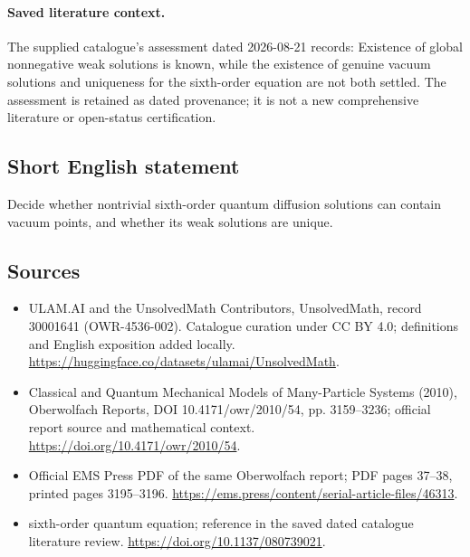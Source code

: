 \documentclass[11pt]{article}
\begin{document}
\paragraph{Saved literature context.} The supplied catalogue's assessment dated 2026-08-21 records: Existence of global nonnegative weak solutions is known, while the existence of genuine vacuum solutions and uniqueness for the sixth-order equation are not both settled. The assessment is retained as dated provenance; it is not a new comprehensive literature or open-status certification.
\subsection{Short English statement}
Decide whether nontrivial sixth-order quantum diffusion solutions can contain vacuum points, and whether its weak solutions are unique.
\subsection{Sources}
\begin{itemize}
\item[\hypertarget{source:30001641:1}{S1}] ULAM.AI and the UnsolvedMath Contributors, UnsolvedMath, record 30001641 (OWR-4536-002). Catalogue curation under CC BY 4.0; definitions and English exposition added locally.
\url{https://huggingface.co/datasets/ulamai/UnsolvedMath}.
\item[\hypertarget{source:30001641:2}{S2}] Classical and Quantum Mechanical Models of Many-Particle Systems (2010), Oberwolfach Reports, DOI 10.4171/owr/2010/54, pp. 3159--3236; official report source and mathematical context.
\url{https://doi.org/10.4171/owr/2010/54}.
\item[\hypertarget{source:30001641:3}{S3}] Official EMS Press PDF of the same Oberwolfach report; PDF pages 37--38, printed pages 3195--3196.
\url{https://ems.press/content/serial-article-files/46313}.
\item[\hypertarget{source:30001641:4}{S4}] sixth-order quantum equation; reference in the saved dated catalogue literature review.
\url{https://doi.org/10.1137/080739021}.
\end{itemize}
\label{end:30001641}
\end{document}
